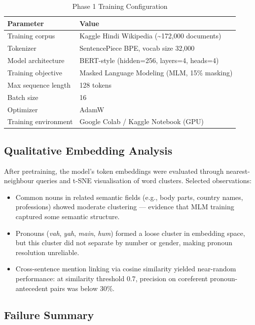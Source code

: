 \documentclass[12pt,a4paper]{report}
\begin{document}
\begin{table}[H]
\centering
\caption{Phase 1 Training Configuration}
\begin{tabular}{|l|l|}
\hline
\textbf{Parameter} & \textbf{Value} \\
\hline
Training corpus & Kaggle Hindi Wikipedia (\textasciitilde172,000 documents) \\
Tokenizer & SentencePiece BPE, vocab size 32,000 \\
Model architecture & BERT-style (hidden=256, layers=4, heads=4) \\
Training objective & Masked Language Modeling (MLM, 15\% masking) \\
Max sequence length & 128 tokens \\
Batch size & 16 \\
Optimizer & AdamW \\
Training environment & Google Colab / Kaggle Notebook (GPU) \\
\hline
\end{tabular}
\end{table}

\subsection{Qualitative Embedding Analysis}

After pretraining, the model's token embeddings were evaluated through nearest-neighbour queries and t-SNE visualisation of word clusters. Selected observations:

\begin{itemize}
    \item Common nouns in related semantic fields (e.g., body parts, country names, professions) showed moderate clustering --- evidence that MLM training captured some semantic structure.
    \item Pronouns (\textit{vah}, \textit{yah}, \textit{main}, \textit{hum}) formed a loose cluster in embedding space, but this cluster did not separate by number or gender, making pronoun resolution unreliable.
    \item Cross-sentence mention linking via cosine similarity yielded near-random performance: at similarity threshold 0.7, precision on coreferent pronoun-antecedent pairs was below 30\%.
\end{itemize}

\subsection{Failure Summary}
\end{document}
